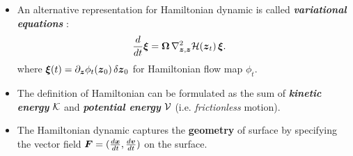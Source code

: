 \documentclass[11pt]{article}
\begin{document}
\begin{itemize}
\item An alternative representation for Hamiltonian dynamic is called \emph{\textbf{variational equations}} \citep{leimkuhler2004simulating}:
\begin{align}
\frac{d}{dt}\boldsymbol{\xi} &= \boldsymbol{\Omega}\, \nabla^{2}_{\boldsymbol{z},\boldsymbol{z}}{\mathcal H}(\boldsymbol{z}_t)\, \boldsymbol{\xi}.\label{eqn: Hamilton_dynamics_general_variational}
\end{align} where $\boldsymbol{\xi}(t) = \partial_{\boldsymbol{z}}\phi_{t}(\boldsymbol{z}_0)\, \delta \boldsymbol{z}_0$ for Hamiltonian flow map $\phi_{t}$.


\item The definition of Hamiltonian can be formulated as the sum of \emph{\textbf{kinetic energy}} ${\mathcal K}$ and \emph{\textbf{potential energy}} ${\mathcal V}$ (i.e. \emph{frictionless} motion).

\item The Hamiltonian dynamic captures the \textbf{geometry} of surface by specifying the vector field $\boldsymbol{F}= (\frac{d \boldsymbol{x}}{dt}, \frac{d \boldsymbol{v}}{dt})$ on the surface.
\end{itemize}
\end{document}

